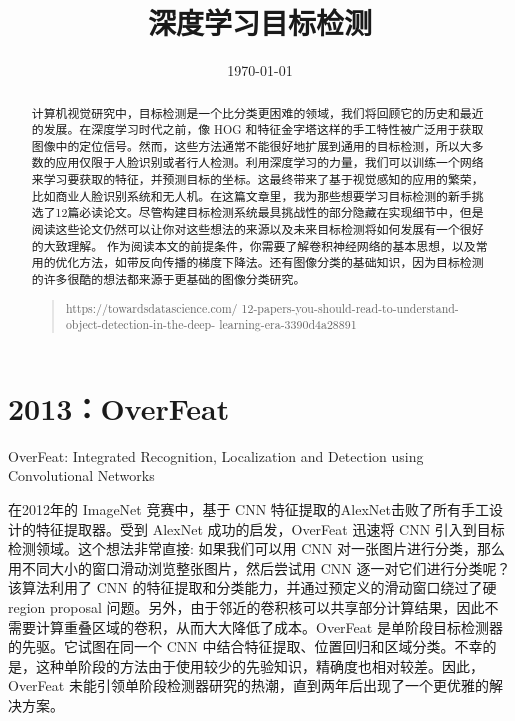 \documentclass{article}
\title{深度学习目标检测}
\date{\today}
\begin{document}
	\maketitle
	\begin{abstract}
		计算机视觉研究中，目标检测是一个比分类更困难的领域，我们将回顾它的历史和最近的发展。在深度学习时代之前，像 HOG 和特征金字塔这样的手工特性被广泛用于获取图像中的定位信号。然而，这些方法通常不能很好地扩展到通用的目标检测，所以大多数的应用仅限于人脸识别或者行人检测。利用深度学习的力量，我们可以训练一个网络来学习要获取的特征，并预测目标的坐标。这最终带来了基于视觉感知的应用的繁荣，比如商业人脸识别系统和无人机。在这篇文章里，我为那些想要学习目标检测的新手挑选了12篇必读论文。尽管构建目标检测系统最具挑战性的部分隐藏在实现细节中，但是阅读这些论文仍然可以让你对这些想法的来源以及未来目标检测将如何发展有一个很好的大致理解。
		作为阅读本文的前提条件，你需要了解卷积神经网络的基本思想，以及常用的优化方法，如带反向传播的梯度下降法。还有图像分类的基础知识，因为目标检测的许多很酷的想法都来源于更基础的图像分类研究。
		\begin{quotation}
		\noindent https://towardsdatascience.com/
		12-papers-you-should-read-to-understand-object-detection-in-the-deep-
		learning-era-3390d4a28891
		\end{quotation}
		
	\end{abstract}
	
	   	\section{2013：OverFeat} 
	   	OverFeat: Integrated Recognition, Localization and Detection using Convolutional Networks
	   	
	   	在2012年的 ImageNet 竞赛中，基于 CNN 特征提取的AlexNet击败了所有手工设计的特征提取器。受到 AlexNet 成功的启发，OverFeat 迅速将 CNN 引入到目标检测领域。这个想法非常直接: 如果我们可以用 CNN 对一张图片进行分类，那么用不同大小的窗口滑动浏览整张图片，然后尝试用 CNN 逐一对它们进行分类呢？该算法利用了 CNN 的特征提取和分类能力，并通过预定义的滑动窗口绕过了硬 region proposal 问题。另外，由于邻近的卷积核可以共享部分计算结果，因此不需要计算重叠区域的卷积，从而大大降低了成本。OverFeat 是单阶段目标检测器的先驱。它试图在同一个 CNN 中结合特征提取、位置回归和区域分类。不幸的是，这种单阶段的方法由于使用较少的先验知识，精确度也相对较差。因此，OverFeat 未能引领单阶段检测器研究的热潮，直到两年后出现了一个更优雅的解决方案。
	   	
\end{document}
